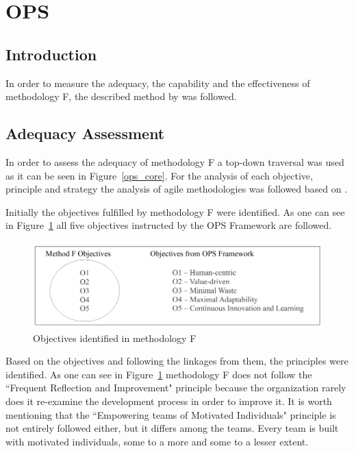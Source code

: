


\section{OPS}

\subsection{Introduction}
In order to measure the adequacy, the capability and the effectiveness of methodology F, the described method by \citet{sventha_dissertation} was followed.

\subsection{Adequacy Assessment}
\label{subsec:adequacy_analysis}

In order to assess the adequacy of methodology F a top-down traversal was used as it can be seen in Figure~\ref{ops_core}. For the analysis of each objective, principle and strategy the analysis of agile methodologies was followed based on \citet{koch2005agile}.

Initially the objectives fulfilled by methodology F were identified. As one can see in Figure~\ref{fig:companyF_objectives} all five objectives instructed by the OPS Framework are followed.

\begin{figure}[H]
\centerline{\includegraphics[scale=0.9]{include/case_study/fig/companyF_objectives.pdf}}
\caption{Objectives identified in methodology F} 
\label{fig:companyF_objectives}
\end{figure}

Based on the objectives and following the linkages from them, the principles were identified. As one can see in Figure~\ref{fig:companyF_objectives} methodology F does not follow the ``Frequent Reflection and Improvement" principle because the organization rarely does it re-examine the development process in order to improve it. %
It is worth mentioning that the ``Empowering teams of Motivated Individuals" principle is not entirely followed either, but it differs among the teams. Every team is built with motivated individuals, some to a more and some to a lesser extent. 

